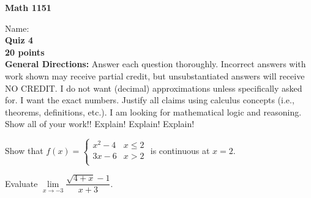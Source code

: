 \documentclass[addpoints,12pt]{exam}
\begin{document}
	\noindent\begin{large}\textbf{Math 1151}\end{large}
	\hspace{2in} Name:\hrulefill\\
	\textbf{Quiz 4}\\
	\textbf{20 points} \\
  
	\noindent\textbf{General Directions:}  Answer each question thoroughly.  Incorrect answers with work shown may receive partial credit, but unsubstantiated answers will receive NO CREDIT.  I do not want (decimal) approximations unless specifically asked for.  I want the exact numbers.  Justify all claims using calculus concepts (i.e., theorems, definitions, etc.).  I am looking for mathematical logic and reasoning.  Show all of your work!! Explain!  Explain!  Explain!  
	
	\begin{questions}
		\question[10] Show that $ f(x)=
		\begin{cases}
			x^2-4 & x \leq 2 \\
			3x-6 & x>2 \\
		\end{cases} $ is continuous at $ x=2 $.
		
		\clearpage
		
		\question[10] Evaluate $\lim\limits_{x \to -3}\dfrac{\sqrt{4+x}-1}{x+3}$.
	\end{questions}
\end{document}
